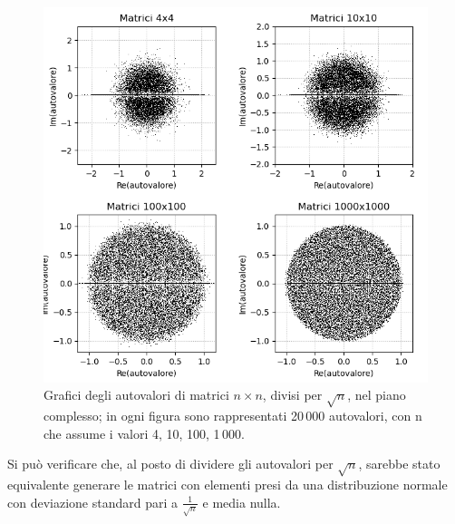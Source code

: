\documentclass[a4paper]{article}
\newcounter{count_es}
\newcounter{count_sub_es}[count_es]
\begin{document}
\begin{figure}[H]
    \centering
    \includegraphics[width=.7\linewidth]{Es_1b.png}
    \caption{Grafici degli autovalori di matrici \(n \times n\), divisi per \(\sqrt{n}\),
    nel piano complesso; in ogni figura sono rappresentati 20\,000 autovalori, con n che assume i valori 4, 10, 100, 1\,000.  \label{fig:es_1b}}
\end{figure}
Si può verificare che, al posto di dividere gli autovalori per \(\sqrt{n}\), sarebbe stato equivalente generare
le matrici con elementi presi da una distribuzione normale con deviazione standard pari a \(\frac{1}{\sqrt{n}}\) e media nulla.
\end{document}
